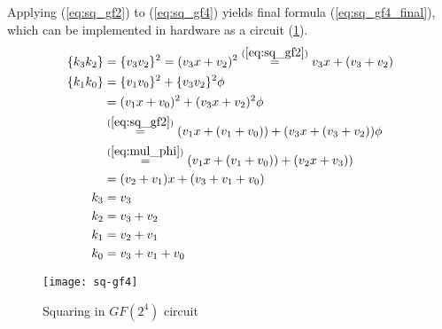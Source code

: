 Applying (\ref{eq:sq_gf2}) to (\ref{eq:sq_gf4}) yields final formula (\ref{eq:sq_gf4_final}), which can be implemented in hardware as a circuit (\ref{fig:sq_gf4}).
\begin{equation}
\label{eq:sq_gf4_final}
\begin{aligned}
\{k_3k_2\} &= \{v_3v_2\}^2 = (v_3x + v_2)^2
\stackrel{(\ref{eq:sq_gf2})}{=}
v_3x + (v_3 + v_2)\\
\{k_1k_0\} &= \{v_1v_0\}^2 + \{v_3v_2\}^2\phi \\
&= (v_1x + v_0)^2 + (v_3x + v_2)^2\phi \\
&\stackrel{(\ref{eq:sq_gf2})}{=}
(v_1x + (v_1 + v_0)) + (v_3x + (v_3 + v_2))\phi \\
&\stackrel{(\ref{eq:mul_phi})}{=}
(v_1x + (v_1 + v_0)) + (v_2x + v_3)) \\
&= (v_2 + v_1)x + (v_3 + v_1 + v_0) \\
k_3 &= v_3 \\
k_2 &= v_3 + v_2 \\
k_1 &= v_2 + v_1 \\
k_0 &= v_3 + v_1 + v_0
\end{aligned}
\end{equation}

\begin{figure}[!h]
\centering
\texttt{[image: sq-gf4]}
\caption{Squaring in $GF(2^4)$ circuit}
\label{fig:sq_gf4}
\end{figure}
